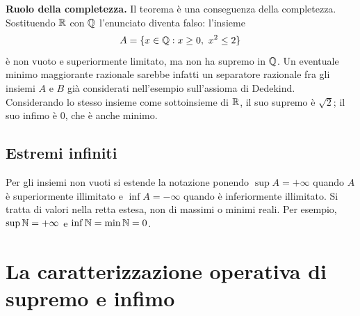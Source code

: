 \textbf{Ruolo della completezza.} Il teorema è una conseguenza della completezza. Sostituendo $\mathbb{R}$ con $\mathbb{Q}$ l'enunciato diventa falso: l'insieme
\[
  A=\{x\in\mathbb{Q}:x\ge0,\ x^2\le2\}
\]
è non vuoto e superiormente limitato, ma non ha supremo in $\mathbb{Q}$. Un eventuale minimo maggiorante razionale sarebbe infatti un separatore razionale fra gli insiemi $A$ e $B$ già considerati nell'esempio sull'assioma di Dedekind. Considerando lo stesso insieme come sottoinsieme di $\mathbb{R}$, il suo supremo è $\sqrt2$; il suo infimo è $0$, che è anche minimo.

\subsection{Estremi infiniti}

Per gli insiemi non vuoti si estende la notazione ponendo $\sup A=+\infty$ quando $A$ è superiormente illimitato e $\inf A=-\infty$ quando è inferiormente illimitato. Si tratta di valori nella retta estesa, non di massimi o minimi reali. Per esempio, $\sup\mathbb{N}=+\infty$ e $\inf\mathbb{N}=\min\mathbb{N}=0$.

\section{La caratterizzazione operativa di supremo e infimo}

